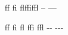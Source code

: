 \documentclass{article}
\begin{document}
ff fi flffiffl -- ---

f\/f f\/i f\/l f\/f\/i f\/f\/l -\/- -\/-\/-
\end{document}
